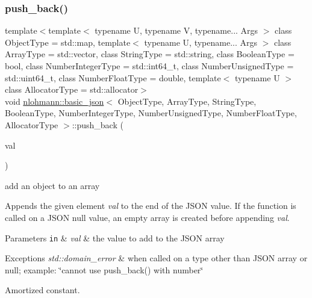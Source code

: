 \subsubsection{\texorpdfstring{push\+\_\+back()}{push\_back()}\hspace{0.1cm}{\footnotesize\ttfamily [1/4]}}
{\footnotesize\ttfamily template$<$template$<$ typename U, typename V, typename... Args $>$ class Object\+Type = std\+::map, template$<$ typename U, typename... Args $>$ class Array\+Type = std\+::vector, class String\+Type  = std\+::string, class Boolean\+Type  = bool, class Number\+Integer\+Type  = std\+::int64\+\_\+t, class Number\+Unsigned\+Type  = std\+::uint64\+\_\+t, class Number\+Float\+Type  = double, template$<$ typename U $>$ class Allocator\+Type = std\+::allocator$>$ \\
void \hyperlink{classnlohmann_1_1basic__json}{nlohmann\+::basic\+\_\+json}$<$ Object\+Type, Array\+Type, String\+Type, Boolean\+Type, Number\+Integer\+Type, Number\+Unsigned\+Type, Number\+Float\+Type, Allocator\+Type $>$\+::push\+\_\+back (\begin{DoxyParamCaption}\item[{\hyperlink{classnlohmann_1_1basic__json}{basic\+\_\+json}$<$ Object\+Type, Array\+Type, String\+Type, Boolean\+Type, Number\+Integer\+Type, Number\+Unsigned\+Type, Number\+Float\+Type, Allocator\+Type $>$ \&\&}]{val }\end{DoxyParamCaption})\hspace{0.3cm}{\ttfamily [inline]}}



add an object to an array 

Appends the given element {\itshape val} to the end of the J\+S\+ON value. If the function is called on a J\+S\+ON null value, an empty array is created before appending {\itshape val}.


\begin{DoxyParams}[1]{Parameters}
\mbox{\tt in}  & {\em val} & the value to add to the J\+S\+ON array\\
\hline
\end{DoxyParams}

\begin{DoxyExceptions}{Exceptions}
{\em std\+::domain\+\_\+error} & when called on a type other than J\+S\+ON array or null; example\+: {\ttfamily \char`\"{}cannot use push\+\_\+back() with number\char`\"{}}\\
\hline
\end{DoxyExceptions}
Amortized constant.


